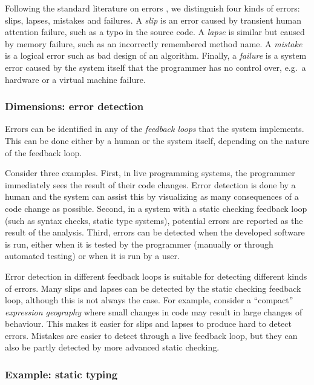 \documentclass[english,submission]{programming}
\begin{document}
Following the standard literature on errors \cite{HumanError}, we
distinguish four kinds of errors: slips, lapses, mistakes and failures.
A \emph{slip} is an error caused by transient human attention failure,
such as a typo in the source code. A \emph{lapse} is similar but caused
by memory failure, such as an incorrectly remembered method name. A
\emph{mistake} is a logical error such as bad design of an algorithm.
Finally, a \emph{failure} is a system error caused by the system itself
that the programmer has no control over, e.g.~a hardware or a virtual
machine failure.

\hypertarget{dimensions-error-detection}{%
\subsubsection{Dimensions: error
detection}\label{dimensions-error-detection}}

Errors can be identified in any of the \emph{feedback loops} that the
system implements. This can be done either by a human or the system
itself, depending on the nature of the feedback loop.

Consider three examples. First, in live programming systems, the
programmer immediately sees the result of their code changes. Error
detection is done by a human and the system can assist this by
visualizing as many consequences of a code change as possible. Second,
in a system with a static checking feedback loop (such as syntax checks,
static type systems), potential errors are reported as the result of the
analysis. Third, errors can be detected when the developed software is
run, either when it is tested by the programmer (manually or through
automated testing) or when it is run by a user.

Error detection in different feedback loops is suitable for detecting
different kinds of errors. Many slips and lapses can be detected by the
static checking feedback loop, although this is not always the case. For
example, consider a ``compact'' \emph{expression geography} where small
changes in code may result in large changes of behaviour. This makes it
easier for slips and lapses to produce hard to detect errors. Mistakes
are easier to detect through a live feedback loop, but they can also be
partly detected by more advanced static checking.

\hypertarget{example-static-typing}{%
\subsubsection{Example: static typing}\label{example-static-typing}}
\end{document}
